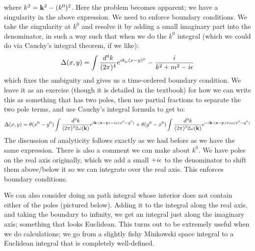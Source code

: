 where $k^2 = \mathbf{k}^2 - (k^0)^2$. Here the problem becomes apparent; we have a singularity in the above expression. We need to enforce boundary conditions. We take the singularity at $k^0$ and resolve it by adding a small imaginary part into the denominator, in such a way such that when we do the $k^0$ integral (which we could do via Cauchy's integral theorem, if we like):
\begin{equation}
    \Delta(x, y) = \int \frac{d^4k}{(2\pi)^4}e^{ik_\mu(x - y)^\mu} - \frac{i}{k^2 + m^2 - i\epsilon} 
\end{equation}
which fixes the ambiguity and gives us a time-ordered boundary condition. We leave it as an exercise (though it is detailed in the textbook) for how we can write this as something that has two poles, then use partial fractions to separate the two pole terms, and use Cauchy's integral formula to get to:
\begin{equation}
    \Delta(x, y) = \theta(x^0 - y^0) \int \frac{d^3k}{(2\pi)^3 2\omega(\mathbf{k})}e^{i\mathbf{k} \cdot (\mathbf{x} - \mathbf{y}) - i\omega(x^0 - y^0)} + \theta(y^0 - x^0)\int \frac{d^3k}{(2\pi)^3 2\omega(\mathbf{k})}e^{-i\mathbf{k} \cdot (\mathbf{x} - \mathbf{y}) + i\omega(x^0 - y^0)}
\end{equation}
The discussion of analyticity follows exactly as we had before as we have the same expression. There is also a comment we can make about $k^0$. We have poles on the real axis originally, which we add a small $+i\epsilon$ to the denominator to shift them above/below it so we can integrate over the real axis. This enforces boundary conditions. 

We can also consider doing an path integral whose interior does not contain either of the poles (pictured below). Adding it to the integral along the real axis, and taking the boundary to infinity, we get an integral just along the imaginary axis; something that looks Euclidean. This turns out to be extremely useful when we do calculations; we go from a slightly fishy Minkowski space integral to a Euclidean integral that is completely well-defined.

